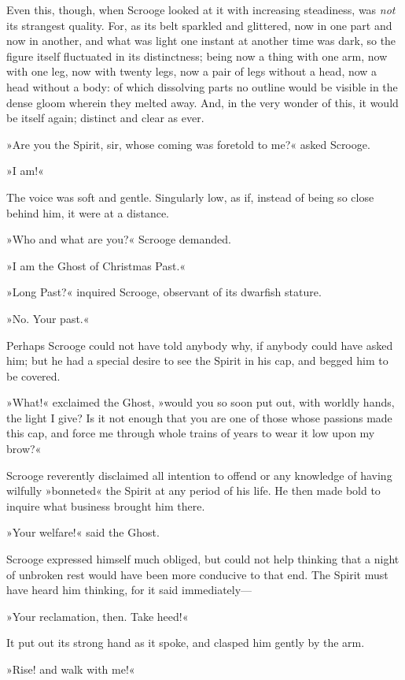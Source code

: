 Even this, though, when Scrooge looked at it with increasing steadiness, was \textit{not} its strangest quality. For, as its belt sparkled and glittered, now in one part and now in another, and what was light one instant at another time was dark, so the figure itself fluctuated in its distinctness; being now a thing with one arm, now with one leg, now with twenty legs, now a pair of legs without a head, now a head without a body: of which dissolving parts no outline would be visible in the dense gloom wherein they melted away. And, in the very wonder of this, it would be itself again; distinct and clear as ever.

»Are you the Spirit, sir, whose coming was foretold to me?« asked Scrooge.

»I am!«

The voice was soft and gentle. Singularly low, as if, instead of being so close behind him, it were at a distance.

»Who and what are you?« Scrooge demanded.

»I am the Ghost of Christmas Past.«

»Long Past?« inquired Scrooge, observant of its dwarfish stature.

»No. Your past.«

Perhaps Scrooge could not have told anybody why, if anybody could have asked him; but he had a special desire to see the Spirit in his cap, and begged him to be covered.

»What!« exclaimed the Ghost, »would you so soon put out, with worldly hands, the light I give? Is it not enough that you are one of those whose passions made this cap, and force me through whole trains of years to wear it low upon my brow?«

Scrooge reverently disclaimed all intention to offend or any knowledge of having wilfully »bonneted« the Spirit at any period of his life. He then made bold to inquire what business brought him there.

»Your welfare!« said the Ghost.

Scrooge expressed himself much obliged, but could not help thinking that a night of unbroken rest would have been more conducive to that end. The Spirit must have heard him thinking, for it said immediately— 

»Your reclamation, then. Take heed!«

It put out its strong hand as it spoke, and clasped him gently by the arm.

»Rise! and walk with me!«

